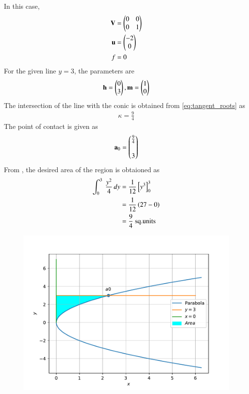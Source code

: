 In this case, 
\begin{align}
	\mathbf{V} &= \begin{pmatrix} 0 & 0 \\ 0 & 1\end{pmatrix} \\
	\mathbf{u} &= \begin{pmatrix}-2 \\ 0\end{pmatrix} \\
	f &= 0
\end{align}
For the given line $y=3$, the parameters are
\begin{align}
	\mathbf{h} = \begin{pmatrix}0 \\ 3\end{pmatrix} , \mathbf{m} = \begin{pmatrix}1 \\ 0 \end{pmatrix}
\end{align}
The intersection of 
the line with the conic is obtained from \eqref{eq:tangent_roots} 
as
\begin{align}
	\kappa  = \frac{9}{4} 
\end{align}
The point of contact is given as
\begin{align}
	\mathbf{a}_0 = \begin{pmatrix}\frac{9}{4}  \\[1pt] \\ 3\end{pmatrix}
\end{align}
From ,
the desired area of the region is obtaioned as
\begin{align}
	\int_{0}^{3} \ \frac{y^2}{4} \,dy &= \frac{1}{12}{}\left[y^3\right]_{0}^{3} \\
	&= \frac{1}{12}\left(27-0\right) \\
	&= \frac{9}{4} \text{ sq.units}
\end{align}
\begin{figure}[!h]
	\begin{center}
		\includegraphics[width=\columnwidth]{chapters/12/8/1/13/figs/problem13.pdf}
	\end{center}
\caption{}
\label{fig:chapters/12/8/1/13/Fig1}
\end{figure}
